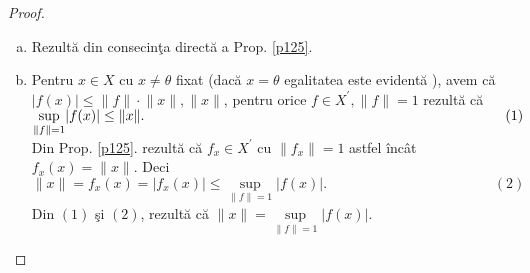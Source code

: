\documentclass[ a4paper, 12pt]{report}
\theoremstyle{definition}
\theoremstyle{remark}
\numberwithin{equation}{section}
\begin{document}
\begin{proof}
\begin{enumerate}[(a)]
\item Rezult\u a din consecin\c ta direct\u a a Prop. \ref{p125}.
\item Pentru $x \in X$ cu $x \neq \theta$ fixat (dac\u a $x = \theta$ egalitatea este evident\u a ), avem c\u a $\lvert f(x) \rvert \leq \lVert f \rVert \cdot \lVert x \rVert, \lVert x \rVert$, pentru orice $f \in X^{'}, \lVert f \rVert = 1$ rezult\u a c\u a $\sup\limits_{\lVert f \rVert = 1} \lvert f(x) \rvert \leq \lVert x \rVert.\hspace{9.1cm}(1)$\\
Din Prop. \ref{p125}. rezult\u a c\u a $f_x \in X^{'}$ cu $\lVert f_x \rVert = 1$ astfel \^inc\^at $f_x(x) = \lVert  x \rVert.$ Deci $\lVert x \rVert = f_x(x) = \lvert f_x(x) \rvert \leq \sup\limits_{\lVert f \rVert = 1}\lvert f(x) \rvert.\hspace{5cm}(2)$\\
Din $(1)$ \c si $(2)$, rezult\u a c\u a $\lVert x \rVert = \sup\limits_{\lVert f \rVert = 1}\lvert f(x) \rvert.$
\end{enumerate}
\end{proof}
\end{document}
